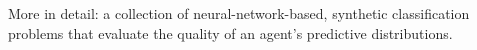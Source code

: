 \documentclass[preview]{standalone}
\begin{document}
\begin{center}
More in detail: a collection of neural-network-based, synthetic classification problems
            that evaluate the quality of an agent’s predictive distributions.
\end{center}
\end{document}
